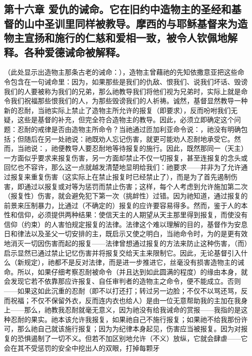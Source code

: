 
\subsection{第十六章 爱仇的诫命。它在旧约中造物主的圣经和基督的山中圣训里同样被教导。摩西的与耶稣基督来为造物主宣扬和施行的仁慈和爱相一致，被令人钦佩地解释。各种爱德诫命被解释。}

（此处显示出造物主那条古老的诫命：），造物主曾藉祂的先知依撒意亚把这些命令包含在一句诫命里：因为，如果那些是我们的仇敌、恨我们、说我们坏话、毁谤我们的人要被称为我们的兄弟，那么祂教导我们将他们视为兄弟时，实际上就是命令我们祝福那些恨我们的人，为那些毁谤我们的人祈祷。诚然，基督显然教导一种新的忍耐，当祂实际上禁止了造物主所允许的报复（即要求），反而吩咐我们无疑，这些是基督的补充，但完全符合造物主的教导。因此，必须立即确定这个问题：忍耐的戒律是否由造物主所命令？当祂通过匝加利亚命令说：，祂没有明确包括；但随后在另一处祂说：祂既劝人忘记伤害，就更可能劝人忍耐地承受它。然而，当祂说：，祂便教导人要忍耐地等待报复的施行。因此，既然那同一（天主）一方面似乎要求来报复伤害，另一方面却禁止不仅一切报复，甚至连报复的念头或回忆也不容许，那么这一点就越发清楚地显明给我们：祂要求——并非为了允许通过报复来重复伤害（这实际上在禁止报复时已经禁止了），而是为了首先遏制伤害，即通过以报复或对等为惩罚而禁止伤害；这样，每个人考虑到允许施加第二次（报复性）伤害，就会避免犯下第一次（挑衅性）过错。因为祂知道，通过报复的前景来压制暴力，比通过（不确定的）报复的应许要容易得多。然而，鉴于人的本性和信仰，必须提供两种结果：使信天主的人期望从天主那里得到报复，而使没有信仰（约束）的人害怕规定报复的法律。法律这个难以理解的目的，基督作为安息日和律法以及圣父一切安排的主，既启示又使之明白，当祂命令时，为的是更有效地消灭一切因伤害而起的报复——法律曾想通过报复的方法来防止这种伤害，（而）启示显然已通过禁止记忆伤害并将报复交给天主来限制它。因此，无论基督引入什么（新规定），祂都不是反对法律，而是进一步推进它，丝毫没有损害造物主的诫命。所以，如果仔细考察忍耐被命令（并且达到如此圆满的程度）的缘由本身，就会发现它若不依靠那应许报复、自任审判者的造物主之命令，便不能成立。否则——如果这如此沉重的忍耐（即不以打还打；转过另一边脸；不仅不以骂还骂，反而祝福；不仅不保留外衣，反而连内衣也给人）是由一位无意帮助我的主加在我身上——那么，祂教我忍耐就毫无意义，因为祂没有给我诫命的赏报——我指的是这种忍耐的果实。祂本该允许我报复，如果祂自己不施行报复；如果祂不给我那份许可，那么祂自己就该施行报复；因为为纪律本身起见，伤害应当被报复。因为对报复的恐惧遏制了一切不义。但若不加区别地允许（不义）放纵，它就会肆虐——它会在其不受惩罚的安全中挖出人的双眼，打掉每颗牙